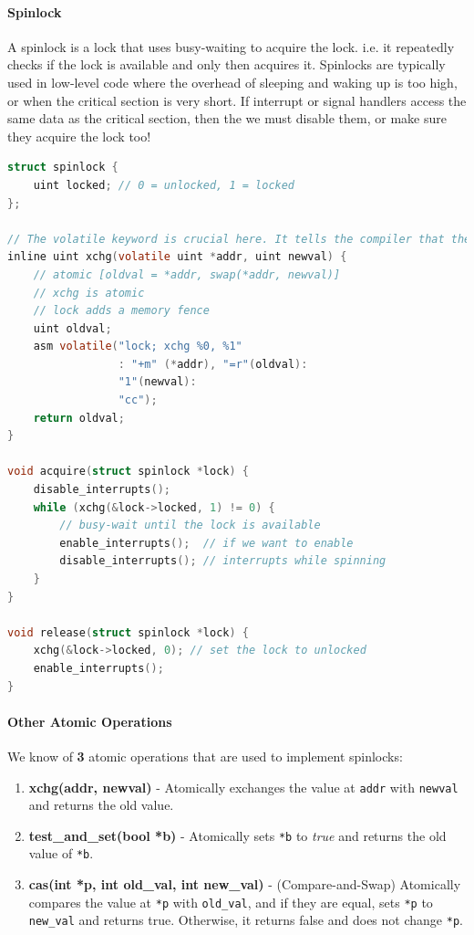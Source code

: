 \documentclass[openany,12pt]{book}
\newcommand{\code}[1]{\texttt{#1}}
\begin{document}
\paragraph{Spinlock} A spinlock is a lock that uses busy-waiting to acquire the lock. i.e. it repeatedly checks if the lock is available and only then acquires it. Spinlocks are typically used in low-level code where the overhead of sleeping and waking up is too high, or when the critical section is very short. If interrupt or signal handlers access the same data as the critical section, then the we must disable them, or make sure they acquire the lock too!

\begin{lstlisting}[language=C, caption={Spinlock Implementation}, label={lst:spinlock}]
struct spinlock {
    uint locked; // 0 = unlocked, 1 = locked
};

// The volatile keyword is crucial here. It tells the compiler that the value at addr can be changed by external factors (like another CPU core or hardware) at any time. This prevents the compiler from making optimizations like caching the value in a register, forcing it to read directly from memory every time.
inline uint xchg(volatile uint *addr, uint newval) {
    // atomic [oldval = *addr, swap(*addr, newval)]
    // xchg is atomic
    // lock adds a memory fence
    uint oldval;
    asm volatile("lock; xchg %0, %1"
                 : "+m" (*addr), "=r"(oldval):
                 "1"(newval):
                 "cc");
    return oldval;
}

void acquire(struct spinlock *lock) {
    disable_interrupts();
    while (xchg(&lock->locked, 1) != 0) {
        // busy-wait until the lock is available
        enable_interrupts();  // if we want to enable
        disable_interrupts(); // interrupts while spinning
    }
}

void release(struct spinlock *lock) {
    xchg(&lock->locked, 0); // set the lock to unlocked
    enable_interrupts(); 
}
\end{lstlisting}


\paragraph{Other Atomic Operations} We know of \textbf{3} atomic operations that are used to implement spinlocks:
\begin{enumerate}
    \item \textbf{xchg(addr, newval)} - Atomically exchanges the value at \code{addr} with \code{newval} and returns the old value.

    \item \textbf{test\_and\_set(bool *b)} - Atomically sets \code{*b} to \textit{true} and returns the old value of \code{*b}.

    \item \textbf{cas(int *p, int old\_val, int new\_val)} - (Compare-and-Swap) Atomically compares the value at \code{*p} with \code{old\_val}, and if they are equal, sets \code{*p} to \code{new\_val} and returns true. Otherwise, it returns false and does not change \code{*p}.
\end{enumerate}
\end{document}
